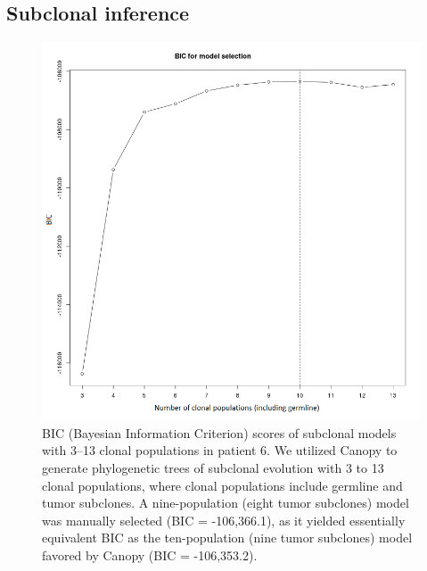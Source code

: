 \subsection{Subclonal inference}
\label{ssec:msiclones:inference}
\begin{figure}[ht]
    \centering
    \includegraphics[width=0.6\linewidth]{images/msiclones/patient6_bic}
	\vspace{-0.3cm}
    \caption[BIC scores of subclonal models with 3--13 clonal populations in patient 6.]{BIC (Bayesian Information Criterion) scores of subclonal models with 3--13 clonal populations in patient 6. We utilized Canopy to generate phylogenetic trees of subclonal evolution with 3 to 13 clonal populations, where clonal populations include germline and tumor subclones. A nine-population (eight tumor subclones) model was manually selected (BIC = -106,366.1), as it yielded essentially equivalent BIC as the ten-population (nine tumor subclones) model favored by Canopy (BIC = -106,353.2).}
    \label{fig:msiclones:bic_5}
\end{figure}

